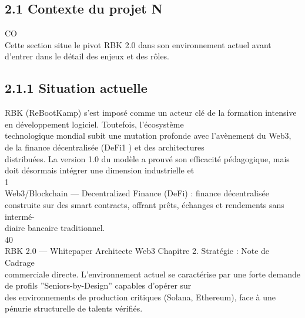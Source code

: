 \documentclass[12pt,landscape,a4paper]{article}
\begin{document}
\subsection{2.1 Contexte du projet                                    N}
CO\\
Cette section situe le pivot RBK 2.0 dans son environnement actuel avant d’entrer dans le détail des enjeux et des rôles.\\
\vspace{0.5em}
\vspace{0.5em}
\subsection{2.1.1 Situation actuelle}
RBK (ReBootKamp) s’est imposé comme un acteur clé de la formation intensive en développement logiciel. Toutefois, l’écosystème\\
technologique mondial subit une mutation profonde avec l’avènement du Web3, de la finance décentralisée (DeFi1 ) et des architectures\\
distribuées. La version 1.0 du modèle a prouvé son efficacité pédagogique, mais doit désormais intégrer une dimension industrielle et\\
1\\
Web3/Blockchain — Decentralized Finance (DeFi) : finance décentralisée construite sur des smart contracts, offrant prêts, échanges et rendements sans intermé-\\
diaire bancaire traditionnel.\\
\vspace{0.5em}
\vspace{0.5em}
\vspace{0.5em}
\vspace{0.5em}
40\\
RBK 2.0 — Whitepaper Architecte Web3                                                                                  Chapitre 2. Stratégie : Note de Cadrage\\
\vspace{0.5em}
\vspace{0.5em}
commerciale directe. L’environnement actuel se caractérise par une forte demande de profils ”Seniors-by-Design” capables d’opérer sur\\
des environnements de production critiques (Solana, Ethereum), face à une pénurie structurelle de talents vérifiés.\\
\vspace{0.5em}
\vspace{0.5em}
\end{document}
